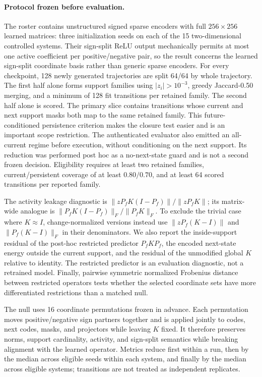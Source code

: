 \paragraph{Protocol frozen before evaluation.}
The roster contains unstructured signed sparse encoders with full
\(256\times256\) learned matrices: three initialization seeds on each of the
15 two-dimensional controlled systems. Their sign-split ReLU output
mechanically permits at most one active coefficient per positive/negative
pair, so the result concerns the learned sign-split coordinate basis rather
than generic sparse encoders. For every checkpoint, 128 newly generated trajectories
are split 64/64 by whole trajectory. The first half alone forms support
families using \(\lvert z_i\rvert>10^{-3}\), greedy Jaccard-0.50 merging, and a
minimum of 128 fit transitions per retained family. The second half alone is
scored. The primary slice contains transitions whose current and next support
masks both map to the same retained family. This future-conditioned
persistence criterion makes the closure test easier and is an important scope
restriction. The authenticated evaluator also emitted an all-current regime
before execution, without conditioning on the next support. Its reduction was
performed post hoc as a no-next-state guard and is not a second frozen
decision. Eligibility requires
at least two retained families, current/persistent coverage of at least
\(0.80/0.70\), and at least 64 scored transitions per reported family.

The activity leakage diagnostic is
\(\lVert zP_fK(I-P_f)\rVert/\lVert zP_fK\rVert\); its matrix-wide analogue is
\(\lVert P_fK(I-P_f)\rVert_F/\lVert P_fK\rVert_F\). To exclude the trivial case
where \(K\approx I\), change-normalized versions instead use
\(\lVert zP_f(K-I)\rVert\) and \(\lVert P_f(K-I)\rVert_F\) in their denominators.
We also report the inside-support residual of the
post-hoc restricted predictor \(P_fKP_f\), the encoded next-state energy
outside the current support, and the residual of the unmodified global \(K\)
relative to identity. The restricted predictor is an evaluation diagnostic,
not a retrained model. Finally, pairwise symmetric normalized Frobenius
distance between restricted operators tests whether the selected coordinate sets have
more differentiated restrictions than a matched null.

The null uses 16 coordinate permutations frozen in advance. Each permutation
moves positive/negative sign partners together and is applied jointly to
codes, next codes, masks, and projectors while leaving \(K\) fixed. It
therefore preserves norms, support cardinality, activity, and sign-split
semantics while breaking alignment with the learned operator. Metrics reduce
first within a run, then by the median across eligible seeds within each
system, and finally by the median across eligible systems; transitions are not
treated as independent replicates.

